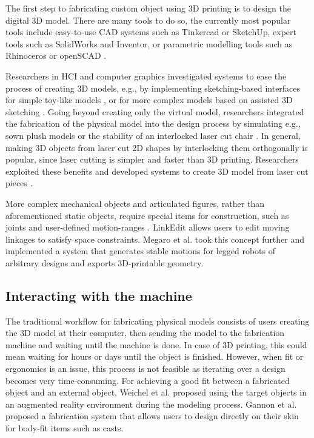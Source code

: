 The first step to fabricating custom object using 3D printing is to design the digital 3D model. There are many tools to do so, the currently most popular tools include easy-to-use CAD systems such as Tinkercad or SketchUp, expert tools such as SolidWorks and Inventor, or parametric modelling tools such as Rhinoceros or openSCAD \cite{imaterialise2017}. 

Researchers in HCI and computer graphics investigated systems to ease the process of creating 3D models, e.g., by implementing sketching-based interfaces for simple toy-like models \cite{Igarashi1999}, or for more complex models based on assisted 3D sketching  \cite{Tsang2004, Bae2008, Bae2009}. Going beyond creating only the virtual model, researchers integrated the fabrication of the physical model into the design process by simulating e.g., sown plush models \cite{Mori2007} or the stability of an interlocked laser cut chair \cite{Saul2011}. In general, making 3D objects from laser cut 2D shapes by interlocking them orthogonally is popular, since laser cutting is simpler and faster than 3D printing. Researchers exploited these benefits and developed systems to create 3D model from laser cut pieces \cite{Hildebrand2012, McCrae2014}.

More complex mechanical objects and articulated figures, rather than aforementioned static objects, require special items for construction, such as joints \cite{Ureta2016} and user-defined motion-ranges \cite{Megaro2014}. LinkEdit \cite{Bacher2015} allows users to edit moving linkages to satisfy space constraints. Megaro et al. \cite{Megaro2015} took this concept further and implemented a system that generates stable motions for legged robots of arbitrary designs and exports 3D-printable geometry.


\subsection{Interacting with the machine}

The traditional workflow for fabricating physical models consists of users creating the 3D model at their computer, then sending the model to the fabrication machine and waiting until the machine is done. In case of 3D printing, this could mean waiting for hours or days until the object is finished. However, when fit or ergonomics is an issue, this process is not feasible as iterating over a design becomes very time-consuming. For achieving a good fit between a fabricated object and an external object, Weichel et al. \cite{Weichel2014, Weichel2015} proposed using the target objects in an augmented reality environment during the modeling process. Gannon et al. \cite{Gannon2015} proposed a fabrication system that allows users to design directly on their skin for body-fit items such as casts.

